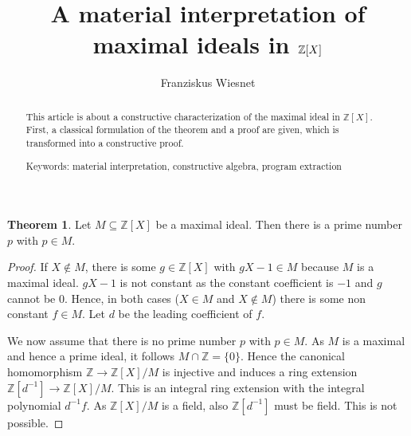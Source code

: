 \documentclass[10pt,a4paper]{article}
\title{\huge A material interpretation of maximal ideals in $\ZZ [X]$}
\author{
Franziskus Wiesnet
}
\theoremstyle{definition}
\newtheorem{theorem}{Theorem}
\newtheorem{corollary}{Corollary}
\newcommand{\ZZ}{\mathbb{Z}}
\newcommand{\ZX}{\mathbb{Z}[X]}
\newcommand{\Zp}{\mathbb{Z}/p\mathbb{Z}}
\begin{document}
\maketitle
\begin{abstract}
This article is about a constructive characterization of the maximal ideal in $\ZZ[X]$. First, a classical formulation of the theorem and a proof are given, which is transformed into a constructive proof.

Keywords: material interpretation, constructive algebra, program extraction
\end{abstract}
\begin{theorem}\label{Thm:Class}
Let $M\subseteq \ZZ[X]$ be a maximal ideal. Then there is a prime number $p$ with $p\in M$.
\end{theorem}
\begin{proof}
If $X\notin M$, there is some $g\in \ZZ[X]$ with $gX-1\in M$ because $M$ is a maximal ideal. $gX-1$ is not constant as the constant coefficient is $-1$ and $g$ cannot be $0$. Hence, in both cases ($X\in M$ and $X\notin M$) there is some non constant $f\in M$. Let $d$ be the leading coefficient of $f$.

We now assume that there is no prime number $p$ with $p\in M$. As $M$ is a maximal and hence a prime ideal, it follows $M\cap \ZZ = \{0\}$. Hence the canonical homomorphism $\ZZ \to \ZZ[X]/M$ is injective and induces a ring extension $\ZZ[d^{-1}]\to \ZZ[X]/M$. This is an integral ring extension with the integral polynomial $d^{-1}f$. As $\ZX /M$ is a field, also $\ZZ[d^{-1}]$ must be field. This is not possible. 
\end{proof}
\end{document}

